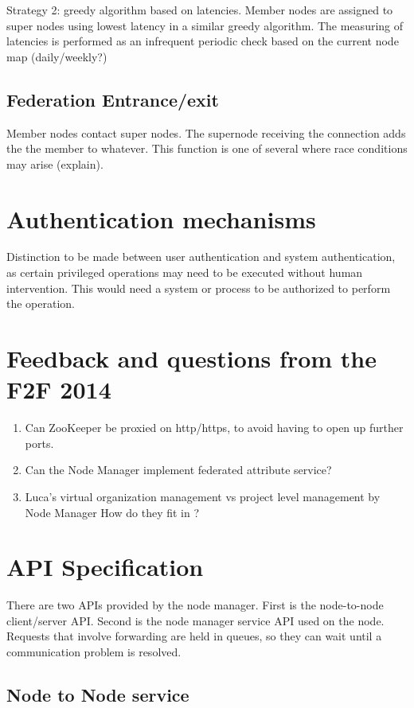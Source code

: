 \documentclass[oneside,12pt]{memoir}
\def\nm{Node Manager{ }}
\begin{document}
Strategy 2:  greedy algorithm based on latencies.  Member nodes are assigned to super nodes using lowest latency in a similar greedy algorithm.  The measuring of latencies is performed as an infrequent periodic check based on the current node map (daily/weekly?)

\subsection{Federation Entrance/exit}
Member nodes contact super nodes.  The supernode receiving the connection adds the the member to whatever.  This function is one of several where race conditions may arise (explain).


\section{Authentication mechanisms}
Distinction to be made between user authentication and system authentication, as certain privileged operations may need to be executed without human intervention. This would need a system or process to be authorized to perform the operation. 



\section{Feedback and questions from the F2F 2014}
\begin{enumerate}
\item Can ZooKeeper be proxied on http/https, to avoid having to open up further ports.
\item Can the \nm implement federated attribute service?
\item Luca's virtual organization management vs project level management by \nm How do they fit in ?
\end{enumerate}

\section{API Specification}

There are two APIs provided by the node manager.  First is the node-to-node client/server API.  Second is the node manager service API used on the node.  Requests that involve forwarding are held in queues, so they can wait until a communication problem is resolved. 

\subsection{Node to Node service}
\end{document}
